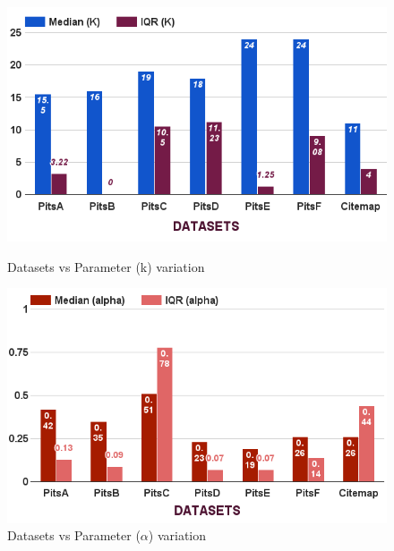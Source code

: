\documentclass[conference]{IEEEtran}
\theoremstyle{break}
\begin{document}
\begin{figure}[!htbp]
    \centering
    \begin{minipage}{.33\textwidth}
        \captionsetup{justification=centering,singlelinecheck=off}
        \includegraphics[width=\linewidth]{./fig/Parameters_variation_k.png}
        \caption{Datasets vs Parameter (k) variation}
        \label{RQ3:k}
    \end{minipage}%
    \begin{minipage}{.33\textwidth}
        \captionsetup{labelsep=space,justification=centering,singlelinecheck=off}
        \includegraphics[width=\linewidth]{./fig/Parameters_variation_a.png}
        \caption{Datasets vs Parameter ($\alpha$) variation}
        \label{RQ3:a}
    \end{minipage}
    \begin{minipage}{.33\textwidth}
        \captionsetup{labelsep=space,justification=centering,singlelinecheck=off}

\end{minipage}
\end{figure}
\end{document}

